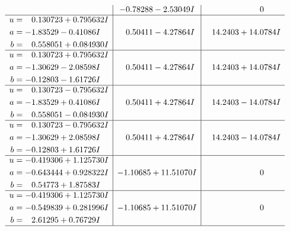 \documentclass[1p]{elsarticle_modified}
\theoremstyle{definition}
\begin{document}
$$\begin{array}{c|c|c}
 & -0.78288 - 2.53049 I & \phantom{-0.000000 } 0 \\ \hline\begin{aligned}
u &= \phantom{-}0.130723 + 0.795632 I \\
a &= -1.83529 - 0.41086 I \\
b &= \phantom{-}0.558051 + 0.084930 I\end{aligned}
 & \phantom{-}0.50411 - 4.27864 I & \phantom{-}14.2403 + 14.0784 I \\ \hline\begin{aligned}
u &= \phantom{-}0.130723 + 0.795632 I \\
a &= -1.30629 - 2.08598 I \\
b &= -0.12803 - 1.61726 I\end{aligned}
 & \phantom{-}0.50411 - 4.27864 I & \phantom{-}14.2403 + 14.0784 I \\ \hline\begin{aligned}
u &= \phantom{-}0.130723 - 0.795632 I \\
a &= -1.83529 + 0.41086 I \\
b &= \phantom{-}0.558051 - 0.084930 I\end{aligned}
 & \phantom{-}0.50411 + 4.27864 I & \phantom{-}14.2403 - 14.0784 I \\ \hline\begin{aligned}
u &= \phantom{-}0.130723 - 0.795632 I \\
a &= -1.30629 + 2.08598 I \\
b &= -0.12803 + 1.61726 I\end{aligned}
 & \phantom{-}0.50411 + 4.27864 I & \phantom{-}14.2403 - 14.0784 I \\ \hline\begin{aligned}
u &= -0.419306 + 1.125730 I \\
a &= -0.643444 + 0.928322 I \\
b &= \phantom{-}0.54773 + 1.87583 I\end{aligned}
 & -1.10685 + 11.51070 I & \phantom{-0.000000 } 0 \\ \hline\begin{aligned}
u &= -0.419306 + 1.125730 I \\
a &= -0.549839 + 0.281996 I \\
b &= \phantom{-}2.61295 + 0.76729 I\end{aligned}
 & -1.10685 + 11.51070 I & \phantom{-0.000000 } 0\\
 \hline 
 \end{array}$$\newpage$$\begin{array}{c|c|c}  

\end{array}$$
\end{document}
